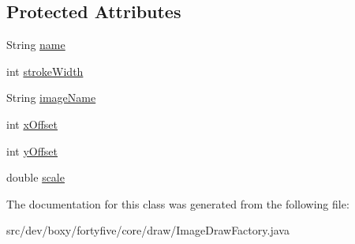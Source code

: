 \subsection*{Protected Attributes}
\begin{DoxyCompactItemize}
\item 
String \hyperlink{group___image_draw_ga0b4425fc6fc125f08a69acd817b3e928}{name}
\item 
int \hyperlink{group___image_draw_ga55543d51eec3d277bc6141062937ac94}{strokeWidth}
\item 
String \hyperlink{group___image_draw_gaebbbe2477cdde233cc84bff269d28bee}{imageName}
\item 
int \hyperlink{group___image_draw_ga6be37b38c2cff42f387e0357b769f6df}{xOffset}
\item 
int \hyperlink{group___image_draw_ga7013263410dc0d0e0cfe528ce2f10eed}{yOffset}
\item 
double \hyperlink{group___image_draw_ga49b6468f905e5801eb9fb81931de7a00}{scale}
\end{DoxyCompactItemize}


The documentation for this class was generated from the following file:\begin{DoxyCompactItemize}
\item 
src/dev/boxy/fortyfive/core/draw/ImageDrawFactory.java\end{DoxyCompactItemize}
